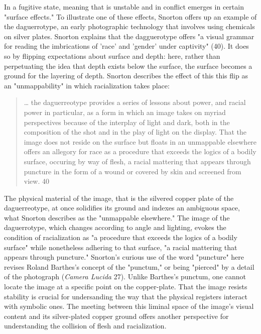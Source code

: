 \documentclass[11pt]{article}
\begin{document}
In a fugitive state, meaning that is unstable and in conflict emerges
in certain "surface effects." To illustrate one of these effects,
Snorton offers up an example of the daguerrotype, an early
photographic technology that involves using chemicals on silver
plates. Snorton explains that the dagguerotype offers "a visual
grammar for reading the imbrications of 'race' and 'gender' under
captivity" (40). It does so by flipping expectations about surface and
depth: here, rather than perpetuating the idea that depth exists below
the surface, the surface becomes a ground for the layering of
depth. Snorton describes the effect of this this flip as an
"unmappability" in which racialization takes place:
\begin{quote}
\ldots{} the daguerreotype provides a series of lessons about power, and
racial power in particular, as a form in which an image takes on
myriad perspectives because of the interplay of light and dark, both
in the composition of the shot and in the play of light on the
display. That the image does not reside on the surface but floats in
an unmappable elsewhere offers an allegory for race as a procedure
that exceeds the logics of a bodily surface, occuring by way of flesh,
a racial mattering that appears through puncture in the form of a
wound or covered by skin and screened from view. 40
\end{quote}
The physical material of the image, that is the silvered copper plate
of the daguerreotype, at once solidifies its ground and indexes an
ambiguous space, what Snorton describes as the "unmappable elsewhere."
The image of the daguerrotype, which changes according to angle and
lighting, evokes the condition of racialization as "a procedure that
exceeds the logics of a bodily surface" while nonetheless adhering to
that surface, "a racial mattering that appears through puncture."
Snorton's curious use of the word "puncture" here revises Roland
Barthes's concept of the "punctum," or being "pierced" by a detail of
the photograph (\emph{Camera Lucida} 27). Unlike Barthes's punctum, one
cannot locate the image at a specific point on the copper-plate. That
the image resists stability is crucial for undersanding the way that
the physical registers interact with symbolic ones. The meeting
between this liminal space of the image's visual content and its
silver-plated copper ground offers another perspective for
understanding the collision of flesh and racialization.
\end{document}

